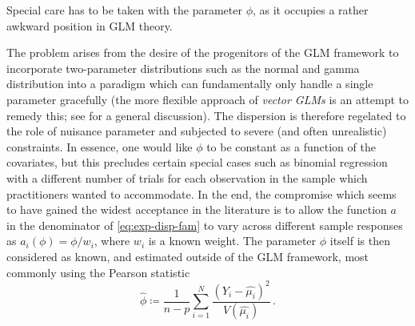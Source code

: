 \documentclass[a4paper]{book}
\begin{document}
Special care has to be taken with the parameter $\phi$, as it occupies a rather awkward position in GLM theory.

The problem arises from the desire of the progenitors of the GLM framework to incorporate two-parameter distributions such as the normal and gamma distribution into a paradigm which can fundamentally only handle a single parameter gracefully (the more flexible approach of \emph{vector GLMs} is an attempt to remedy this; see \cite[Chapter 2]{yee} for a general discussion). The dispersion is therefore regelated to the role of nuisance parameter and subjected to severe (and often unrealistic) constraints. In essence, one would like $\phi$ to be constant as a function of the covariates, but this precludes certain special cases such as binomial regression with a different number of trials for each observation in the sample which practitioners wanted to accommodate. In the end, the compromise which seems to have gained the widest acceptance in the literature is to allow the function $a$ in the denominator of \cref{eq:exp-disp-fam} to vary across different sample responses as $a_i(\phi) = \phi / w_i$, where $w_i$ is a known weight. The parameter $\phi$ itself is then considered as known, and estimated outside of the GLM framework, most commonly using the Pearson statistic
\begin{equation}
  \widehat{\phi} \coloneqq \frac{1}{n - p} \sum_{i = 1}^N \frac{(Y_i - \widehat{\mu_i})^2}{V(\widehat{\mu_i})} \,.
\end{equation}
\end{document}
